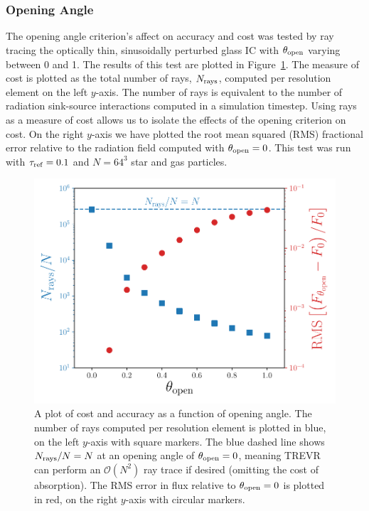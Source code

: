 \documentclass[fleq,usenatbib]{mnras}
\newcommand{\acro}{TREVR}
\newcommand{\bigO}[1]{\mathcal{O}\left(#1\right)}
\newcommand{\tr}{\tau_{\rm ref}}
\newcommand{\tO}{\theta_{\rm open}}
\begin{document}
{\subsubsection{Opening Angle}
The opening angle criterion's affect on accuracy and cost was tested by 
ray tracing the optically thin, sinusoidally perturbed glass IC with $\tO$ 
varying between 0 and 1. The results of this test are plotted in 
Figure~\ref{fig:openangle}. The measure of cost is plotted as the total number 
of rays, $N_{\rm rays}$, computed per resolution element on the left $y$-axis. 
The number of rays is equivalent to the number of radiation sink-source 
interactions computed in a simulation timestep. Using rays as a measure of 
cost allows us to isolate the effects of the opening criterion on cost. On 
the right $y$-axis we have plotted the root mean squared (RMS) fractional 
error relative to the radiation field computed with $\tO=0$. This test was run 
with $\tr = 0.1$ and $N=64^3$ star and gas particles.
\begin{figure}
\includegraphics[width=1\linewidth]{Figures/opening_angle.pdf}
\caption{A plot of cost and accuracy as a function of opening angle. The 
number of rays computed per resolution element is plotted in blue, on the left 
$y$-axis with square markers. The blue dashed line shows $N_{\rm rays}/N 
= N$ at an opening angle of $\tO=0$, meaning \acro{} can perform an 
$\bigO{N^2}$ ray trace if desired (omitting the cost of absorption). The RMS 
error in flux relative to $\tO=0$ is plotted in red, on the right $y$-axis 
with circular markers.}
\label{fig:openangle}
\end{figure}

}
\end{document}
